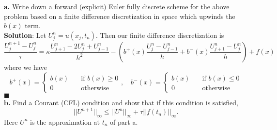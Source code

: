 \documentclass[11pt]{article}
\begin{document}
{\bf a.} Write down a forward (explicit) Euler fully discrete scheme for the above problem based on a finite difference discretization in space which upwinds the $b(x)$ term.
\\[8pt]

{\bf Solution}: Let $U^n_j = u(x_j, t_n)$. Then our finite difference discretization is 
\begin{equation}
\frac{U^{n+1}_j - U^n_j}{\tau} = \kappa\frac{U^n_{j+1} - 2U^n_j + U^n_{j-1}}{h^2} - \left( b^+(x)\frac{U^n_j - U^n_{j-1}}{h} + b^-(x)\frac{U^n_{j+1} - U^n_j}{h} \right) + f(x)
\end{equation}
where we have 
\begin{equation*}
b^+(x) = 
\begin{cases}
b(x) \quad &\text{if } b(x) \geq 0 \\
0 \quad &\text{otherwise}
\end{cases},
\quad b^-(x) = 
\begin{cases}
b(x) \quad &\text{if } b(x) \leq 0 \\
0 \quad &\text{otherwise}
\end{cases}
\end{equation*}
$\blacksquare$
\\[16pt]


{\bf b.} Find a Courant (CFL) condition and show that if this condition is satisfied, 
\[ ||U^{n+1}||_\infty \leq ||U^n||_\infty + \tau||f(t_n)||_\infty. \]
Here $U^n$ is the approximation at $t_n$ of part a. 


\vskip 1cm
\end{document}
